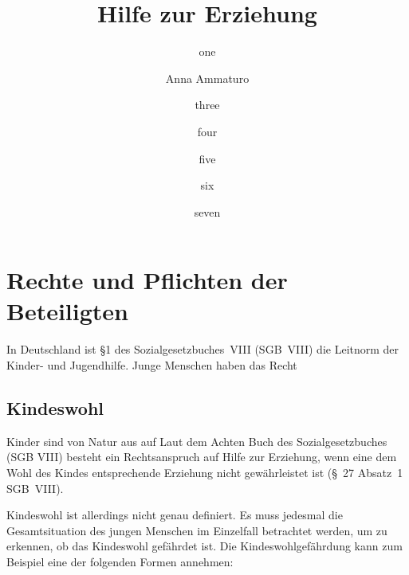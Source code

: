\documentclass{ejsreport}
\begin{document}
\title{Hilfe zur Erziehung}
\author{
  one
  \and
  Anna Ammaturo
  \and
  three
  \and
  four
  \and
  five
  \and
  six
  \and
  seven  
}

\maketitle{}
\tableofcontents{}

\setcounter{chapter}{1}
\chapter[Rechte und Pflichten der Beteiligten]{Rechte und Pflichten der Beteiligten }

In Deutschland ist §1 des Sozialgesetzbuches~VIII (SGB~VIII) 
die Leitnorm der Kinder- und Jugendhilfe. \autocite[Vgl.][S.78]{Albrecht2019}
Junge Menschen haben das Recht 





\section{Kindeswohl}

Kinder sind von Natur aus auf  
Laut dem Achten Buch des Sozialgesetzbuches (SGB VIII) besteht ein Rechtsanspruch 
auf Hilfe zur Erziehung, wenn eine dem Wohl des Kindes 
entsprechende Erziehung nicht gewährleistet ist 
(§~27 Absatz~1 SGB~VIII). 

Kindeswohl ist allerdings nicht genau definiert. 
Es muss jedesmal die Gesamtsituation des jungen
Menschen im Einzelfall betrachtet werden, um zu erkennen, 
ob das Kindeswohl gefährdet ist.
Die Kindeswohlgefährdung kann zum Beispiel 
eine der folgenden Formen annehmen: \autocite[Vgl.][S.~38~ff.]{Maihorn2009}
\end{document}
